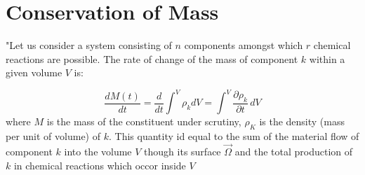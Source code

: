 \section{Conservation of Mass}

"Let us consider a system consisting of $n$ components amongst which $r$ chemical reactions are possible. 
The rate of change of the mass of component $k$ within a given volume $V$ is:

\begin{equation}
\frac{d M(t)}{dt} = \frac{d}{dt}\int^V \rho_k dV = \int^V \frac{\partial \rho_k}{\partial t}\, dV
\label{dGM1}
\end{equation}
where $M$ is the mass of the constituent under scrutiny, $\rho_K$ is the density (mass per unit of volume) of $k$. This quantity id equal to the sum of the material flow of component $k$ into the volume $V$ though its surface $\vec{\Omega}$ and the total production of $k$ in chemical reactions which occor inside $V$

